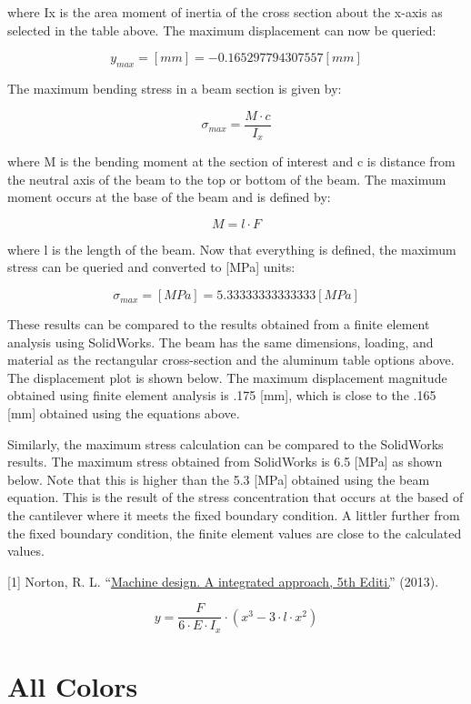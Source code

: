 \documentclass[
  letterpaper,
]{article}
\begin{document}
where Ix is the area moment of inertia of the cross section about the
x-axis as selected in the table above. The maximum displacement can now
be queried:

\[\boxed{ y_{max}=\left[mm\right] =-0.165297794307557 \left[mm\right]  }\]

The maximum bending stress in a beam section is given by:

\[ \sigma_{max}=\frac{M\cdot c}{I_{x}}   \]

where M is the bending moment at the section of interest and c is
distance from the neutral axis of the beam to the top or bottom of the
beam. The maximum moment occurs at the base of the beam and is defined
by:

\[ M=l\cdot F   \]

where l is the length of the beam. Now that everything is defined, the
maximum stress can be queried and converted to {[}MPa{]} units:

\[\boxed{ \sigma_{max}=\left[MPa\right] =5.33333333333333 \left[MPa\right]  }\]

These results can be compared to the results obtained from a finite
element analysis using SolidWorks. The beam has the same dimensions,
loading, and material as the rectangular cross-section and the aluminum
table options above. The displacement plot is shown below. The maximum
displacement magnitude obtained using finite element analysis is .175
{[}mm{]}, which is close to the .165 {[}mm{]} obtained using the
equations above.

Similarly, the maximum stress calculation can be compared to the
SolidWorks results. The maximum stress obtained from SolidWorks is 6.5
{[}MPa{]} as shown below. Note that this is higher than the 5.3
{[}MPa{]} obtained using the beam equation. This is the result of the
stress concentration that occurs at the based of the cantilever where it
meets the fixed boundary condition. A littler further from the fixed
boundary condition, the finite element values are close to the
calculated values.

{[}1{]} Norton, R. L.
``\href{https://www.pearson.com/us/higher-education/program/Norton-Machine-Design-5th-Edition/PGM275676.html}{Machine
design. A integrated approach, 5th Editi.}'' (2013).

\[ y=\frac{F}{6\cdot E\cdot I_{x}}\cdot\left(x^{3}-3\cdot l\cdot x^{2}\right)   \]

\section{All Colors}\label{all-colors}
\end{document}
